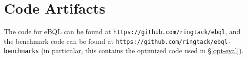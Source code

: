 \appendix

\section{Code Artifacts}
\label{app:ex-code}

The code for eBQL can be found at \texttt{https://github.com/ringtack/ebql}, and the benchmark code
can be found at \texttt{https://github.com/ringtack/ebql-benchmarks} (in particular, this contains
the optimized code used in \S \ref{opt-eval}).
